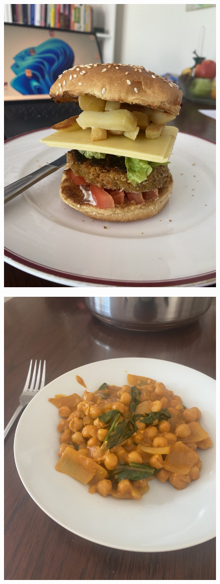 \documentclass[]{article}
\begin{document}
\newpage\begin{figure}[H]
\begin{center}\hyperref[rec:Lentil Burgers]{\includegraphics[keepaspectratio,width=\textheight,height=\textwidth,angle=-90]{Gallery/Lentil Burgers}}\caption*{}\label{fig:Lentil Burgers}\end{center}
\end{figure}
\newpage\begin{figure}[H]
\begin{center}\hyperref[rec:Chickpea Curry]{\includegraphics[keepaspectratio,width=\textheight,height=\textwidth,angle=-90]{Gallery/Chickpea Curry}}\caption*{}\label{fig:Chickpea Curry}\end{center}
\end{figure}
\end{document}
